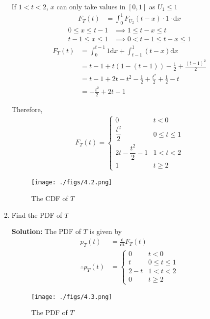 \documentclass[journal,12pt,twocolumn]{IEEEtran}
\newcommand{\solution}{\noindent \textbf{Solution: }}
\providecommand{\der}[1]{\mathrm{d} #1}
\numberwithin{equation}{section}
\renewcommand\thesection{\arabic{section}}
\begin{document}
\begin{enumerate}[label=\thesection.\arabic*,ref=\thesection.\theenumi]
	If $1 < t < 2$, $x$ can only take values in $[0,1]$ as $U_1 \le 1$
	\begin{align}
		F_T(t)	&= \int_0^1 F_{U_2}(t-x) \cdot 1 \cdot \der{x} 
	\end{align}
	\begin{align}
		0 \le x \le t - 1 &\implies 1 \le t - x \le t \\
		t - 1 \le x \le 1 &\implies 0 < t - 1 \le t - x \le 1
	\end{align}
	\begin{align}
		F_T(t) &= \int_0^{t-1} 1 \der{x} + \int_{t-1}^1 (t-x)\der{x} \\
		&= t - 1 + t(1 - (t - 1)) - \frac{1}{2} + \frac{(t-1)^2}{2} \\
		&= t - 1 + 2t - t^2 -\frac{1}{2} + \frac{t^2}{2} + \frac{1}{2} - t \\ 
		&= -\frac{t^2}{2} + 2t - 1
	\end{align}
	
	Therefore,
	\begin{align}
		F_T(t) = 
		\begin{cases}
		0 & t < 0 \\
		\dfrac{t^2}{2} & 0 \le t \le 1 \\
		 2t -\dfrac{t^2}{2} - 1 & 1 < t < 2 \\
		1 & t \ge 2
		\end{cases}
	\end{align}
	
	\begin{figure}
		\centering
		\texttt{[image: ./figs/4.2.png]}
		\caption{The CDF of $T$}
		\label{fig-4.2}
	\end{figure}	
	
	\item Find the PDF of $T$
	
	\solution The PDF of $T$ is given by
	\begin{align}
		p_T(t) &= \frac{\der{}}{\der{t}} F_T(t) \\
		\therefore p_T(t) &=
		\begin{cases}
			0 & t < 0 \\
			t & 0 \le t \le 1 \\
			2 - t & 1 < t < 2 \\
			0 & t \ge 2
		\end{cases}
	\end{align}
	
	\begin{figure}
		\centering
		\texttt{[image: ./figs/4.3.png]}
		\caption{The PDF of $T$}
		\label{fig-4.3}
	\end{figure}		
	

\end{enumerate}
\end{document}
